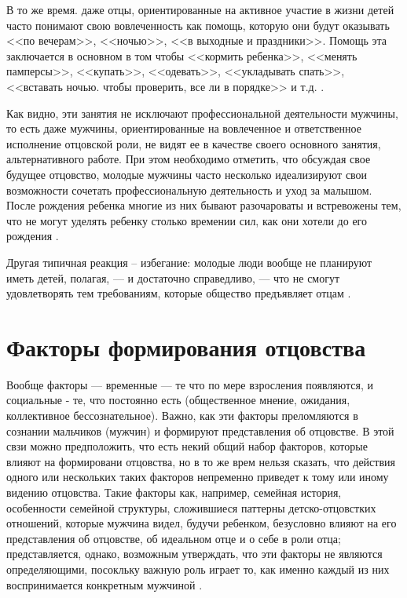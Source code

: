 \documentclass{../../common/thesisbyxetex}
\begin{document}
В то же время. даже отцы, ориентированные на активное участие в жизни детей часто понимают свою
вовлеченность как помощь, которую они будут оказывать
<<по вечерам>>, <<ночью>>, <<в выходные и праздники>>. Помощь эта заключается в основном в том
чтобы <<кормить ребенка>>, <<менять памперсы>>, <<купать>>, <<одевать>>, <<укладывать спать>>,
<<вставать ночью. чтобы проверить, все ли в порядке>> и т.д. \cite[369]{tri}.

Как видно, эти занятия не исключают профессиональной деятельности мужчины, то есть даже мужчины,
ориентированные на вовлеченное и ответственное исполнение отцовской роли, не видят ее в качестве
своего основного занятия, альтернативного работе. При этом необходимо отметить, что обсуждая свое
будущее отцовство, молодые мужчины часто несколько идеализируют свои возможности сочетать
профессиональную деятельность и уход за малышом. После рождения ребенка многие из них бывают
разочароваты и встревожены тем, что не могут уделять ребенку столько времении сил, как они хотели
до его рождения \cite{tri}.

Другая типичная  реакция -- избегание: молодые люди вообще не планируют иметь детей, полагая, --- и
достаточно справедливо, --- что не смогут удовлетворять
тем требованиям, которые общество предъявляет отцам \cite{imaf}.



\chapter{Факторы формирования отцовства}

Вообще факторы --- временные --- те что по мере взросления появляются, и социальные - те, что
постоянно есть (общественное мнение, ожидания, коллективное бессознательное). Важно, как эти
факторы преломляются в сознании мальчиков (мужчин) и формируют представления об отцовстве. В этой
свзи можно предположить, что есть некий общий набор факторов, которые влияют на формировани
отцовства, но в то же врем нельзя сказать, что действия одного или нескольких таких факторов
непременно приведет к тому или иному видению отцовства. Такие факторы как, например, семейная
история, особенности семейной структуры, сложившиеся паттерны детско-отцовстких отношений,
которые мужчина видел, будучи ребенком, безусловно влияют на его представления об отцовстве, об
идеальном отце и о себе в роли отца; представляется, однако, возможным утверждать, что эти
факторы не являются определяющими, посокльку важную роль играет то, как именно каждый из них
воспринимается конкретным мужчиной \cite[164]{long}.
\end{document}

